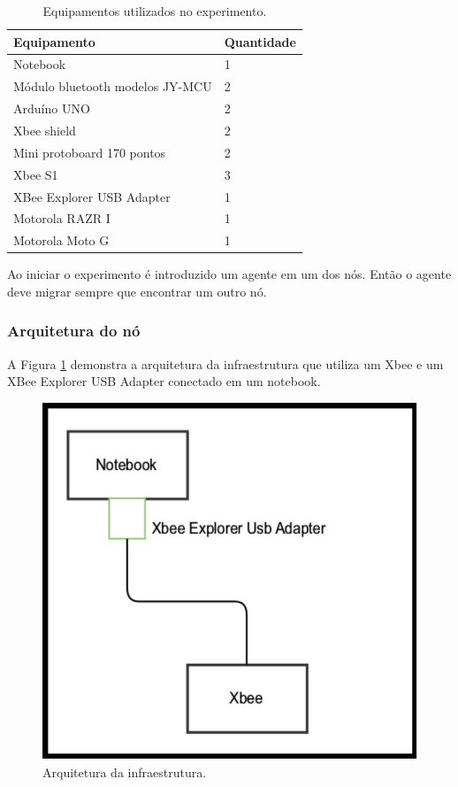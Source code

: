 \begin{table}[ht]
	\caption{Equipamentos utilizados no experimento.}
	\centering
	\begin{tabular}{|l|l|}
		\hline
		Equipamento & Quantidade \\ \hline
		Notebook & 1 \\ \hline 
		Módulo bluetooth modelos JY-MCU & 2 \\ \hline
		Arduíno UNO & 2 \\ \hline
		Xbee shield & 2 \\ \hline
		Mini protoboard 170 pontos & 2 \\ \hline
		Xbee S1 & 3 \\ \hline
		XBee Explorer USB Adapter & 1 \\ \hline 
		Motorola RAZR I & 1 \\ \hline
		Motorola Moto G & 1 \\ \hline
	\end{tabular}
	\label{tab:componentesPrototipo}
\end{table}

Ao iniciar o experimento é introduzido um agente em um dos nós. Então o agente deve migrar sempre que encontrar um outro nó.

\subsubsection{Arquitetura do nó}

A Figura \ref{fig:arquiteturaPrototipoInfraestrtura} demonstra a arquitetura da infraestrutura que utiliza um Xbee e um XBee Explorer USB Adapter conectado em um notebook.

\begin{figure}[htbp]
	\centering
	\includegraphics[scale=0.5]{metodologia/figuras/arquiteturaPrototipoInfraestrtura.pdf}
	\caption{Arquitetura da infraestrutura.}
	\label{fig:arquiteturaPrototipoInfraestrtura}
\end{figure}


